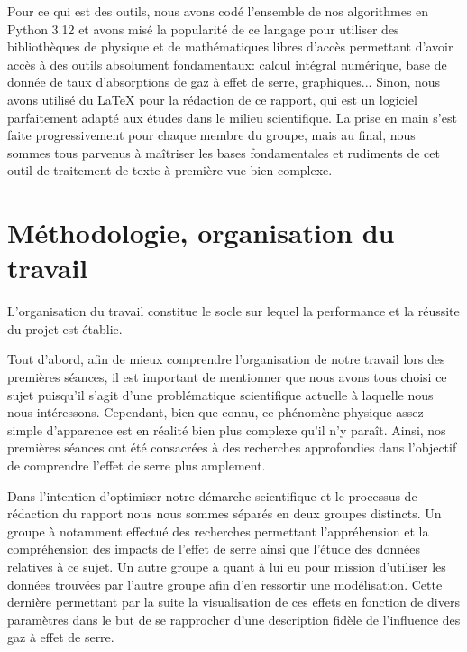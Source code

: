\documentclass[a4paper, 12pt]{report} %
\begin{document}
\indent Pour ce qui est des outils, nous avons codé l'ensemble de nos algorithmes en Python 3.12 et avons misé
la popularité de ce langage pour utiliser des bibliothèques de physique et de mathématiques libres d'accès
permettant d'avoir accès à des outils absolument fondamentaux: calcul intégral numérique, 
base de donnée de taux d'absorptions de gaz à effet de serre, graphiques... Sinon, nous avons utilisé du \LaTeX
pour la rédaction de ce rapport, qui est un logiciel parfaitement adapté aux études dans le milieu scientifique.
La prise en main s'est faite progressivement pour chaque membre du groupe, mais au final, nous sommes tous parvenus
à maîtriser les bases fondamentales et rudiments de cet outil de traitement de texte à première vue bien complexe.


\chapter{Méthodologie, organisation du travail}


\indent L’organisation du travail constitue le socle sur lequel la performance et la réussite du projet est établie. \vspace{\baselineskip}

Tout d’abord, afin de mieux comprendre l’organisation de notre travail lors des premières séances, il est important de mentionner que nous avons tous choisi ce sujet puisqu’il s’agit d’une problématique scientifique actuelle à laquelle nous nous intéressons. Cependant, bien que connu, ce phénomène physique assez simple d’apparence est en réalité bien plus complexe qu’il n’y paraît. Ainsi, nos premières séances ont été consacrées à des recherches approfondies dans l’objectif de comprendre l’effet de serre plus amplement.\vspace{\baselineskip}

Dans l’intention d'optimiser notre démarche scientifique et le processus de rédaction du rapport nous nous sommes séparés en deux groupes distincts. 
Un groupe à notamment effectué des recherches permettant l'appréhension et la compréhension des impacts de l'effet de serre ainsi que l'étude des données relatives à ce sujet. Un autre groupe a quant à lui eu pour mission d'utiliser les données trouvées par l'autre groupe afin d'en ressortir une modélisation. Cette dernière permettant par la suite la visualisation de ces effets en fonction de divers paramètres dans le but de se rapprocher d'une description fidèle de l'influence des gaz à effet de serre.\vspace{\baselineskip}
\end{document}
